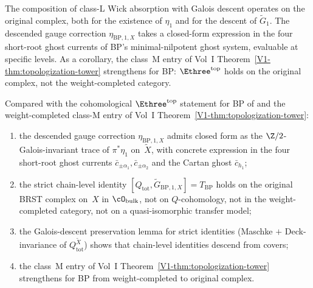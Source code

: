 The composition of class-L Wick absorption with Galois descent operates on the original complex, both for the existence of $\eta_1$ and for the descent of $\widetilde G_1$. The descended gauge correction $\eta_{\mathrm{BP}, 1, X}$ takes a closed-form expression in the four short-root ghost currents of BP's minimal-nilpotent ghost system, evaluable at specific levels. As a corollary, the class~M entry of Vol~I Theorem~\ref{V1-thm:topologization-tower} strengthens for BP: $\Ethree^{\mathrm{top}}$ holds on the original complex, not the weight-completed category.

\begin{remark}
\label{rem:bp-new}
Compared with the cohomological $\Ethree^{\mathrm{top}}$ statement for BP of \cite[Theorem~\ref*{thm:E3-topological-DS-general-explicit-BP}]{Vol2-fractional-ghost-platonic} and the weight-completed class-M entry of Vol~I Theorem~\ref{V1-thm:topologization-tower}:
\begin{enumerate}
\item the descended gauge correction $\eta_{\mathrm{BP}, 1, X}$ admits closed form as the $\Z/2$-Galois-invariant trace of $\pi^{\ast}\eta_1$ on~$\widetilde X$, with concrete expression in the four short-root ghost currents $\bar c_{\pm \alpha_1}, \bar c_{\pm \alpha_2}$ and the Cartan ghost $\bar c_{h_1}$;
\item the strict chain-level identity $[Q_{\mathrm{tot}}, \widetilde G_{\mathrm{BP}, 1, X}] = T_{\mathrm{BP}}$ holds on the original BRST complex on~$X$ in $\cO_{\mathrm{bulk}}$, not on $Q$-cohomology, not in the weight-completed category, not on a quasi-isomorphic transfer model;
\item the Galois-descent preservation lemma for strict identities (Maschke $+$ Deck-invariance of $Q_{\mathrm{tot}}^{\widetilde X}$) shows that chain-level identities descend from covers;
\item the class~M entry of Vol~I Theorem~\ref{V1-thm:topologization-tower} strengthens for BP from weight-completed to original complex.
\end{enumerate}
\end{remark}

